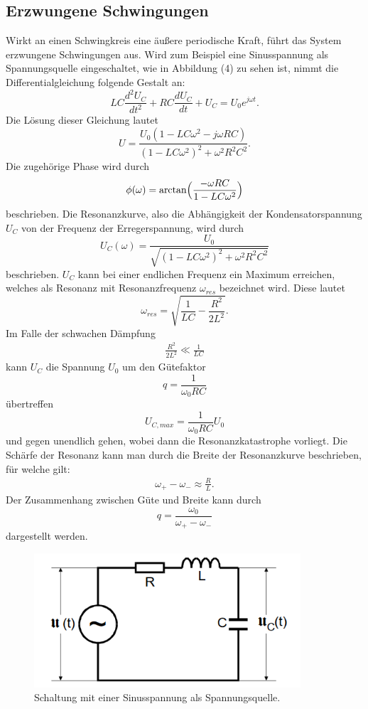 \subsection{Erzwungene Schwingungen}
Wirkt an einen Schwingkreis eine äußere periodische Kraft, führt das System erzwungene Schwingungen aus.
Wird zum Beispiel eine Sinusspannung als Spannungsquelle eingeschaltet, wie in Abbildung (4) zu sehen ist,
nimmt die Differentialgleichung folgende Gestalt an:
\begin{equation}
LC\frac{d^2 U_C}{dt^2} + RC\frac{d U_C}{dt} + U_C = U_0 e^{j\omega t} .
\end{equation}
Die Lösung dieser Gleichung lautet
\begin{equation}
U = \frac{U_0(1-LC\omega^2 - j\omega RC)}{(1-LC\omega^2)^2 + \omega^2 R^2 C^2} .
\end{equation}
Die zugehörige Phase wird durch 
\begin{equation}
\phi(\omega) = \text{arctan}\Bigl(\frac{-\omega RC}{1-LC\omega^2}\Bigr)
\end{equation}
beschrieben.
Die Resonanzkurve, also die Abhängigkeit der Kondensatorspannung $U_C$ von der Frequenz der Erregerspannung, wird durch
\begin{equation}
U_C(\omega) = \frac{U_0}{\sqrt{(1-LC\omega^2)^2 + \omega^2 R^2 C^2}}
\end{equation}
beschrieben. $U_C$ kann bei einer endlichen Frequenz ein Maximum erreichen, welches als Resonanz mit Resonanzfrequenz $\omega_{res}$ bezeichnet wird.
Diese lautet
\begin{equation}
\omega_{res} = \sqrt{\frac{1}{LC} - \frac{R^2}{2L^2}} .
\end{equation}
Im Falle der schwachen Dämpfung
\begin{align*}
\frac{R^2}{2L^2} \ll \frac{1}{LC}
\end{align*}
kann $U_C$ die Spannung $U_0$ um den Gütefaktor
\begin{equation}
q = \frac{1}{\omega_0 RC}
\end{equation}
\noindent übertreffen 
\begin{equation}
U_{C,max} = \frac{1}{\omega_0 RC}U_0
\end{equation}
und gegen unendlich gehen, wobei dann die Resonanzkatastrophe vorliegt.
Die Schärfe der Resonanz kann man durch die Breite der Resonanzkurve beschrieben, für welche gilt:
\begin{align}
\omega _+ - \omega _- \approx \frac{R}{L} .
\end{align}
\noindent Der Zusammenhang zwischen Güte und Breite kann durch
\begin{equation}
q = \frac{\omega_0}{\omega_+ - \omega_-}
\end{equation}
dargestellt werden.
\begin{figure}[H]
  \centering
  \includegraphics[height=5cm]{erzwungen.png}
  \caption{Schaltung mit einer Sinusspannung als Spannungsquelle. \cite[S.6]{kent}}
\end{figure}
